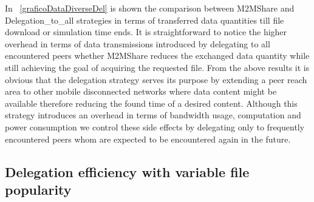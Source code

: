 In \figurename~\ref{graficoDataDiverseDel} is shown the comparison between M2MShare and Delegation\_to\_all strategies in terms of transferred data quantities till file download or simulation time ends. It is straightforward to notice the higher overhead in terms of data transmissions introduced by delegating to all encountered peers whether M2MShare reduces the exchanged data quantity while still achieving the goal of acquiring the requested file. From the above results it is obvious that the delegation strategy serves its purpose by extending a peer reach area to other mobile disconnected networks where data content might be available therefore reducing the found time of a desired content.
Although this strategy introduces an overhead in terms of bandwidth usage, computation and power consumption we control these side effects by delegating only to frequently encountered peers whom are expected to be encountered again in the future.



\newpage 
\subsection{Delegation efficiency with variable file popularity}

